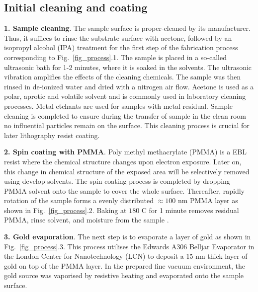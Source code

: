 \documentclass[10pt,a4paper,twoside]{article}
\begin{document}
\begin{multicols}{2}
\subsection{Initial cleaning and coating}
\textbf{1. Sample cleaning}. The sample surface is proper-cleaned by its manufacturer. Thus, it suffices to rinse the substrate surface with acetone, followed by an isopropyl alcohol (IPA) treatment for the first step of the fabrication process corresponding to Fig.~\ref{fig_process}.1. The sample is placed in a so-called ultrasonic bath for 1-2 minutes, where it is soaked in the solvents. The ultrasonic vibration amplifies the effects of the cleaning chemicals. The sample was then rinsed in de-ionized water and dried with a nitrogen air flow. Acetone is used as a polar, aprotic and volatile solvent and is commonly used in laboratory cleaning processes. Metal etchants are used for samples with metal residual. Sample cleaning is completed to ensure during the transfer of sample in the clean room no influential particles remain on the surface. This cleaning process is crucial for later lithography resist coating. 
\par 
\textbf{2. Spin coating with PMMA}. Poly methyl methacrylate (PMMA) is a EBL resist where the chemical structure changes upon electron exposure. Later on, this change in chemical structure of the exposed area will be selectively removed using develop solvents. The spin coating process is completed by dropping PMMA solvent onto the sample to cover the whole surface. Thereafter, rapidly rotation of the sample forms a evenly distributed $\approx 100$ nm PMMA layer as shown in Fig.~\ref{fig_process}.2. Baking at $180$ C for 1 minute removes residual PMMA, rinse solvent, and moisture from the sample \cite{MICROCHEM}. 
\par 
\textbf{3. Gold evaporation}. The next step is to evaporate a layer of gold as shown in Fig.~\ref{fig_process}.3. This process utilises the Edwards A306 Belljar Evaporator in the London Center for Nanotechnology (LCN) to deposit a 15 nm thick layer of gold on top of the PMMA layer. In the prepared fine vacuum environment, the gold source was vaporised by resistive heating and evaporated onto the sample surface.
\par 

\end{multicols}
\end{document}

